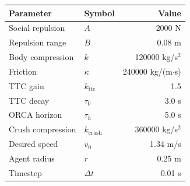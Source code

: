 \begin{tabular}{llr}
\hline
\textbf{Parameter} & \textbf{Symbol} & \textbf{Value} \\
\hline
Social repulsion & $A$ & 2000 N \\
Repulsion range & $B$ & 0.08 m \\
Body compression & $k$ & 120000 kg/s$^2$ \\
Friction & $\kappa$ & 240000 kg/(m$\cdot$s) \\
TTC gain & $k_\text{{ttc}}$ & 1.5 \\
TTC decay & $\tau_0$ & 3.0 s \\
ORCA horizon & $\tau_h$ & 5.0 s \\
Crush compression & $k_\text{{crush}}$ & 360000 kg/s$^2$ \\
Desired speed & $v_0$ & 1.34 m/s \\
Agent radius & $r$ & 0.25 m \\
Timestep & $\Delta t$ & 0.01 s \\
\hline
\end{tabular}